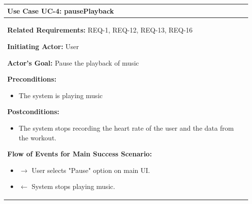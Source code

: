 \documentclass[letterpaper,english, 12pt]{scrreprt}
\begin{document}
\begin{center}
        \begin{tabular}{|C{15cm}|}
                \hline
                        \textbf{Use Case UC-4: pausePlayback}\\
                \hline
                        \begin{flushleft}
                                \textbf{Related Requirements: } REQ-1, REQ-12, REQ-13, REQ-16
                        \end{flushleft}
                        \begin{flushleft}
                                \textbf{Initiating Actor: } User
                        \end{flushleft}
                        \begin{flushleft}
                                \textbf{Actor's Goal: } Pause the playback of music
                        \end{flushleft}
                        \begin{flushleft}
                                \textbf{Preconditions: }
                        \end{flushleft}
                                \begin{itemize}
                                        \item The system is playing music
                                \end{itemize}
                        \begin{flushleft}
                                \textbf{Postconditions: }
                        \end{flushleft}
                                \begin{itemize}
                                        \item The system stops recording the heart rate of the user and the data from the workout.
                                \end{itemize}
                        \begin{flushleft}
                                \textbf{Flow of Events for Main Success Scenario: }
                        \end{flushleft}
                                \begin{itemize}
                                        \item $\rightarrow$ User selects "Pause" option on main UI.
                                        \item $\leftarrow$ System stops playing music.
                                \end{itemize}
                \hline
        \end{tabular}
\end{center}
\end{document}
